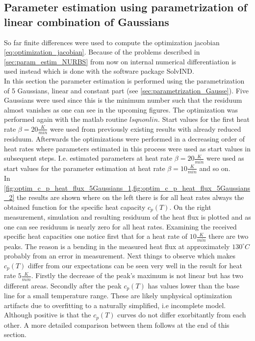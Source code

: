 \documentclass{scrartcl}[12pt, halfparskip]
\numberwithin{equation}{section}
\numberwithin{figure}{section}
\numberwithin{table}{section}
\begin{document}
\subsection{Parameter estimation using parametrization of linear combination of Gaussians}
\label{sec:param_estimation_5Gausse}
So far finite differences were used to compute the optimization jacobian \cref{eq:optimization_jacobian}. Because of the problems described in \cref{sec:param_estim_NURBS} from now on internal numerical differentiation is used instead which is done with the software package SolvIND. \\
In this section the parameter estimation is performed using the parametrization of 5 Gaussians, linear and constant part (see \cref{sec:parametrization_Gausse}). Five Gaussians were used since this is the minimum number such that the residuum almost vanishes as one can see in the upcoming figures. The optimization was performed again with the matlab routine $lsqnonlin$. Start values for the first heat rate $\beta = 20 \frac{K}{min}$ were used from previously existing results with already reduced residuum. Afterwards the optimizations were performed in a decreasing order of heat rates where parameters estimated in this process were used as start values in subsequent steps. I.e. estimated parameters at heat rate $\beta=20 \frac{K}{min}$ were used as start values for the parameter estimation at heat rate $\beta=10 \frac{K}{min}$ and so on. \\
In \cref{fig:optim_c_p_heat_flux_5Gaussians_1,fig:optim_c_p_heat_flux_5Gaussians_2} the results are shown where on the left there is for all heat rates always the obtained function for the specific heat capacity $c_p(T)$. On the right measurement, simulation and resulting residuum of the heat flux is plotted and as one can see residuum is nearly zero for all heat rates. Examining the received specific heat capacities one notice first that for a heat rate of $10 \frac{K}{min}$ there are two peaks. The reason is a bending in the measured heat flux at approximately $130^{\circ} C$ probably from an error in measurement. Next things to observe which makes $c_p(T)$ differ from our expectations can be seen very well in the result for heat rate $5 \frac{K}{min}$. Firstly the decrease of the peak's maximum is not linear but has two different areas. Secondly after the peak $c_p(T)$ has values lower than the base line for a small temperature range. These are likely unphysical optimization artifacts due to overfitting to a naturally simplified, i.e incomplete model. Although positive is that the $c_p(T)$ curves do not differ exorbitantly from each other. A more detailed comparison between them follows at the end of this section.
\end{document}
